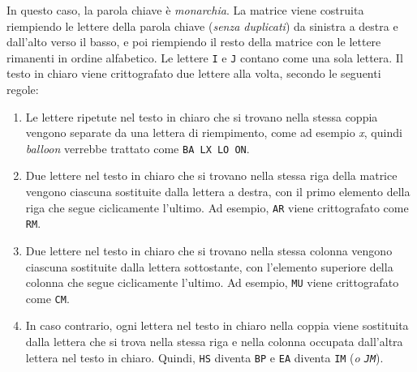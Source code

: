 \begin{center}
    \end{center}
In questo caso, la parola chiave è \textit{monarchia}. La matrice viene costruita riempiendo
le lettere della parola chiave (\textit{senza duplicati}) da sinistra a destra e dall'alto verso
il basso, e poi riempiendo il resto della matrice con le lettere rimanenti in ordine alfabetico.
Le lettere \verb|I| e \verb|J| contano come una sola lettera. Il testo in chiaro viene crittografato
due lettere alla volta, secondo le seguenti regole:
\begin{enumerate}
    \item Le lettere ripetute nel testo in chiaro che si trovano nella stessa coppia 
    vengono separate da una lettera di riempimento, come ad esempio \textit{x}, quindi \textit{balloon} 
    verrebbe trattato come \texttt{BA LX LO ON}.
    \item Due lettere nel testo in chiaro che si trovano nella stessa riga della matrice
    vengono ciascuna sostituite dalla lettera a destra, con il primo elemento della riga
    che segue ciclicamente l'ultimo. Ad esempio, \texttt{AR} viene crittografato come \texttt{RM}.
    \item Due lettere nel testo in chiaro che si trovano nella stessa colonna vengono ciascuna
    sostituite dalla lettera sottostante, con l'elemento superiore della colonna che segue
    ciclicamente l'ultimo. Ad esempio, \texttt{MU} viene crittografato come \texttt{CM}.
    \item In caso contrario, ogni lettera nel testo in chiaro nella coppia viene sostituita
    dalla lettera che si trova nella stessa riga e nella colonna occupata dall'altra lettera
    nel testo in chiaro. Quindi, \texttt{HS} diventa \texttt{BP} e
    \texttt{EA} diventa \texttt{IM} (\textit{o \texttt{JM}}).
\end{enumerate}
